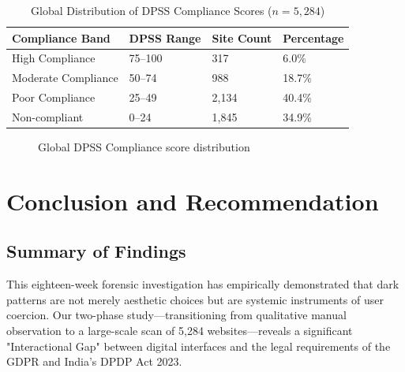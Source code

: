 \documentclass[12pt,a4paper]{report}
\begin{document}
\newpage

\begin{table}[H]
\centering
\caption{Global Distribution of DPSS Compliance Scores ($n = 5{,}284$)}
\label{tab:dpss}
\begin{tabular}{L{4cm} C{2.5cm} C{2.5cm} C{2.5cm}}
\toprule
{}
\color{white}\textbf{Compliance Band} &
\color{white}\textbf{DPSS Range} &
\color{white}\textbf{Site Count} &
\color{white}\textbf{Percentage} \\
\midrule
High Compliance & 75--100 & 317 & 6.0\% \\
Moderate Compliance & 50--74 & 988 & 18.7\% \\
Poor Compliance & 25--49 & 2,134 & 40.4\% \\
Non-compliant & 0--24 & 1,845 & 34.9\% \\
\bottomrule
\end{tabular}
\end{table}

\begin{figure}[H]
\centering
{}
\caption{Global DPSS Compliance score distribution}
\label{fig:dpss_dist}
\end{figure}

\chapter{Conclusion and Recommendation}

\section{Summary of Findings}
This eighteen-week forensic investigation has empirically demonstrated that dark patterns are not merely aesthetic choices but are systemic instruments of user coercion. Our two-phase study—transitioning from qualitative manual observation to a large-scale scan of 5,284 websites—reveals a significant "Interactional Gap" between digital interfaces and the legal requirements of the GDPR and India’s DPDP Act 2023.
\end{document}
